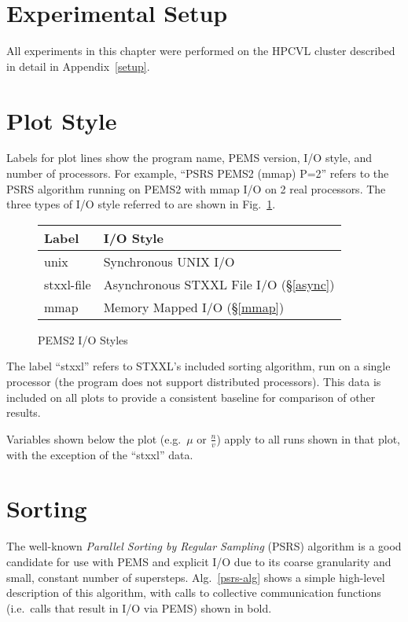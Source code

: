 \documentclass[12pt]{carletoncsthesis}
\begin{document}
\section{Experimental Setup}


All experiments in this chapter were performed on the HPCVL cluster described
in detail in Appendix~\ref{setup}.

\section{Plot Style}


Labels for plot lines show the program name, PEMS version, I/O style,
and number of processors.  For example, ``PSRS PEMS2 (mmap) P=2'' refers
to the PSRS algorithm running on PEMS2 with mmap I/O on 2 real processors.
The three types of I/O style referred to are shown in Fig.~\ref{io-styles}.
\begin{figure}[ht]
\begin{center}
\begin{tabular}{l|l}
Label & I/O Style \\ \hline
unix & Synchronous UNIX I/O \\
stxxl-file & Asynchronous STXXL File I/O (\S\ref{async}) \\
mmap & Memory Mapped I/O (\S\ref{mmap}) \\
\end{tabular}
\label{io-styles}
\caption{PEMS2 I/O Styles}
\end{center}
\end{figure}

The label ``stxxl'' refers to STXXL's included sorting algorithm, run on
a single processor (the program does not support distributed processors).
This data is included on all plots to provide a consistent baseline for
comparison of other results.

Variables shown below the plot (e.g.\ $\mu$ or $\frac{n}{v}$) apply to all
runs shown in that plot, with the exception of the ``stxxl'' data.

\clearpage
\section{Sorting}
\label{psrs-sec}


The well-known {\em Parallel Sorting by Regular Sampling} \cite{psrs}
(PSRS) algorithm is a good candidate for use with PEMS and explicit I/O
due to its coarse granularity and small, constant number of supersteps.
Alg.~\ref{psrs-alg} shows a simple high-level description of this algorithm,
with calls to collective communication functions (i.e.\ calls that result in
I/O via PEMS) shown in bold.
\end{document}
